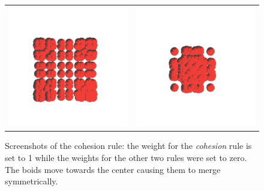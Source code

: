 \begin{figure}[htbp]
\begin{center}
\begin{tabular}{cc}
\includegraphics[scale= 0.5]{figures/coh3.pdf} &
\includegraphics[scale= 0.5]{figures/coh4.pdf}
\end{tabular}
\end{center}
\caption{Screenshots of the cohesion rule: the weight for the \textit{cohesion} rule is set to 1 while the weights for the other two rules were set to zero. The boids move towards the center causing them to merge symmetrically.}
\label{cohRule}
\end{figure}

